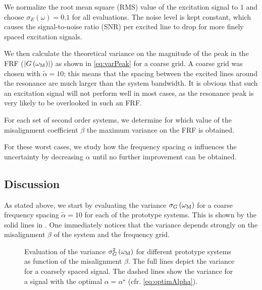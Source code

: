   We normalize the root mean square (RMS) value of the excitation signal to $1$ and choose $\sigma_E\left( \omega \right) = 0.1$ for all evaluations.
  The noise level is kept constant, which causes the signal-to-noise ratio (SNR) per excited line to drop for more finely spaced excitation signals.
  
  We then calculate the theoretical variance on the magnitude of the peak in the FRF ($\left| G\left( \omega_{\mathrm{M}} \right) \right|$) as shown in \eqref{eq:varPeak} for a coarse grid.
  A coarse grid was chosen with $\tilde{\alpha} = 10$; this means that the spacing between the excited lines around the resonance are much larger than the system bandwidth.
  It is obvious that such an excitation signal will not perform well in most cases, as the resonance peak is very likely to be overlooked in such an FRF.
  
  For each set of second order systems, we determine for which value of the misalignment coefficient $\beta$ the maximum variance on the FRF is obtained.
  
  For these worst cases, we study how the frequency spacing $\alpha$ influences the uncertainty by decreasing $\alpha$ until no further improvement can be obtained.

  \subsection{Discussion} \label{sec:bestFrequencyResolution}
  As stated above, we start by evaluating the variance $\sigma_G\left( \omega_{\mathrm{M}}\right)$ for a coarse frequency spacing $\tilde{\alpha} = 10$ for each of the prototype systems.
  This is shown by the solid lines in .
  One immediately notices that the variance depends strongly on the misalignment $\beta$ of the system and the frequency grid.
  
  \begin{figure}
    \centering
      \setlength{}
      \setlength\figureheight{0.68\figurewidth}
    
    \caption[Variance $\sigma_G^2\left( \wM \right)$ as a function of the grid misalignment coefficient $\beta$.]{Evaluation of the variance $\sigma_G^2\left( \wM \right) $ for different prototype systems as function of the misalignment $\beta$.
             The full lines depict the variance for a coarsely spaced signal.
             The dashed lines show the variance for a signal with the optimal $\alpha = \alpha^{\star}$ (cfr. \eqref{eq:optimAlpha}).}
    \label{fig:worstCaseBeta}
  \end{figure}

